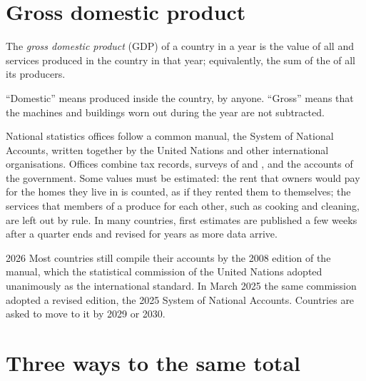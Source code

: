 \section{Gross domestic product}

\begin{definition}\label{def:g8:gdp:gdp}
The \emph{gross domestic product} (GDP) of a country in a year
is the value of all  and services produced in the country in that year; equivalently,
the sum of the  of all its producers.
\end{definition}

``Domestic'' means produced inside the country, by anyone. ``Gross'' means that the machines and
buildings worn out during the year are not subtracted.

\begin{measure}
National statistics offices follow a common manual, the System of National Accounts, written
together by the United Nations and other international organisations. Offices combine tax records, surveys of  and , and the accounts of the
government. Some values must be estimated: the rent that owners would pay for the homes they live
in is counted, as if they rented them to themselves; the services that members of a 
produce for each other, such as cooking and cleaning, are left out by rule. In many countries, first
estimates are published a few weeks after a quarter ends and revised for years as more data arrive.
\end{measure}

\begin{dated}{2026}
Most countries still compile their accounts by the 2008 edition of the manual, which the statistical
commission of the United Nations adopted unanimously as the international standard. In March 2025
the same commission adopted a revised edition, the 2025 System of National Accounts. Countries are
asked to move to it by 2029 or 2030.
\end{dated}

\section{Three ways to the same total}

